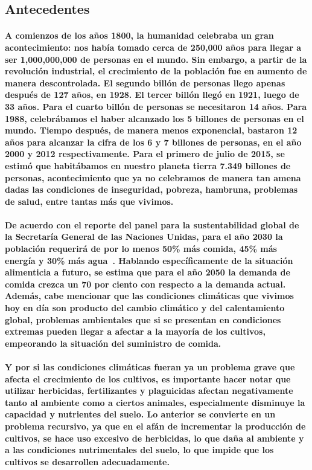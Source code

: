 \documentclass[10pt, twocolumn]{article}
\begin{document}
\subsection{Antecedentes}
\paragraph{A comienzos de los años 1800, la humanidad celebraba un gran acontecimiento: nos había tomado cerca de 250,000 años para llegar a ser 1,000,000,000 de personas en el mundo. Sin embargo, a partir de la revolución industrial, el crecimiento de la población fue en aumento de manera descontrolada. El segundo billón de personas llego apenas después de 127 años, en 1928. El tercer billón llegó en 1921, luego de 33 años. Para el cuarto billón de personas se necesitaron 14 años. Para 1988, celebrábamos el haber alcanzado los 5 billones de personas en el mundo. Tiempo después, de manera menos exponencial, bastaron 12 años para alcanzar la cifra de los 6 y 7 billones de personas, en el año 2000 y 2012 respectivamente. Para el primero de julio de 2015, se estimó que habitábamos en nuestro planeta tierra 7.349 billones de personas, acontecimiento que ya no celebramos de manera tan amena dadas las condiciones de inseguridad, pobreza, hambruna, problemas de salud, entre tantas más que vivimos.}

\paragraph{De acuerdo con el reporte del panel para la sustentabilidad global de la Secretaría General de las Naciones Unidas, para el año 2030 la población requerirá de por lo menos 50\% más comida, 45\% más energía y 30\% más agua~\cite{globalsustainabilityreport}. Hablando específicamente de la situación alimenticia a futuro, se estima que para el año 2050 la demanda de comida crezca un 70 por ciento con respecto a la demanda actual. \\ Además, cabe mencionar que las condiciones climáticas que vivimos hoy en día son producto del cambio climático y del calentamiento global, problemas ambientales que si se presentan en condiciones extremas pueden llegar a afectar a la mayoría de los cultivos, empeorando la situación del suministro de comida.}

\paragraph{Y por si las condiciones climáticas fueran ya un problema grave que afecta el crecimiento de los cultivos, es importante hacer notar que utilizar herbicidas, fertilizantes y plaguicidas afectan negativamente tanto al ambiente como a ciertos animales, especialmente disminuye la capacidad y nutrientes del suelo. Lo anterior se convierte en un problema recursivo, ya que en el afán de incrementar la producción de cultivos, se hace uso excesivo de herbicidas, lo que daña al ambiente y a las condiciones nutrimentales del suelo, lo que impide que los cultivos se desarrollen adecuadamente.}
\end{document}
